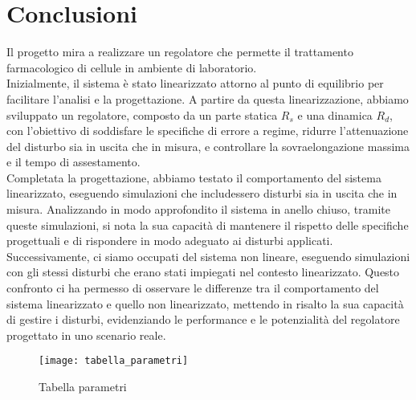\documentclass[a4paper, 11pt]{article}
\begin{document}
\section{Conclusioni}


Il progetto mira a realizzare un regolatore che permette il trattamento farmacologico di cellule in ambiente di laboratorio.
\\
Inizialmente, il sistema è stato linearizzato attorno al punto di equilibrio per facilitare l’analisi e la progettazione. 
A partire da questa linearizzazione, abbiamo sviluppato un regolatore, composto da un parte statica $R_s$ e una dinamica $R_d$, con l’obiettivo di soddisfare le specifiche di errore a regime, ridurre l’attenuazione del disturbo sia in uscita che in misura, e controllare la sovraelongazione massima e il tempo di assestamento.
\\
Completata la progettazione, abbiamo testato il comportamento del sistema linearizzato, eseguendo simulazioni che includessero disturbi sia in uscita che in misura. Analizzando in modo approfondito il sistema in anello chiuso, tramite queste simulazioni, si nota la sua capacità di mantenere il rispetto delle specifiche progettuali e di rispondere in modo adeguato ai disturbi applicati.
\\
Successivamente, ci siamo occupati del sistema non lineare, eseguendo simulazioni con gli stessi disturbi che erano stati impiegati nel contesto linearizzato. 
Questo confronto ci ha permesso di osservare le differenze tra il comportamento del sistema linearizzato e quello non linearizzato, mettendo in risalto la sua capacità di gestire i disturbi, evidenziando le  performance e le potenzialità del regolatore progettato in uno scenario reale.

\clearpage
\begin{figure}
    \centering
    \texttt{[image: tabella\_parametri]}
    \caption{Tabella parametri}
    \label{fig:enter-label}
\end{figure}
\end{document}
